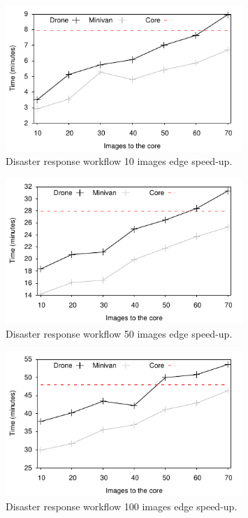 \begin{figure}[h!]
  \includegraphics[width=0.8\textwidth]{Results/SmallSpeed}
  \caption{Disaster response workflow 10 images edge speed-up.}
  \label{fig:SmallSpeed}
  \vspace{-2ex}
\end{figure}

\begin{figure}[h!]
  \includegraphics[width=0.8\textwidth]{Results/MediumSpeed}
  \caption{Disaster response workflow 50 images edge speed-up.}
  \label{fig:MediumSpeed}
  \vspace{-2ex}
\end{figure}

\begin{figure}[h!]
  \includegraphics[width=0.8\textwidth]{Results/BigSpeed}
  \caption{Disaster response workflow 100 images edge speed-up.}
  \label{fig:BigSpeed}
  \vspace{-2ex}
\end{figure}

